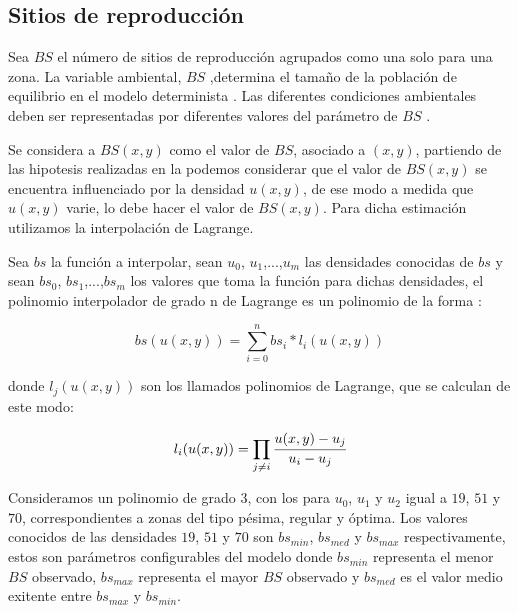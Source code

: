 \subsection{Sitios de reproducción}
\label{subsec:cap4-sitios de reproduccion}
Sea $BS$ el número de sitios de reproducción agrupados como una solo para una zona. La variable
ambiental, $BS$ ,determina el tamaño de la población de equilibrio en el modelo determinista
\cite{otero2006stochastic}. Las diferentes condiciones ambientales deben ser
representadas por diferentes valores del parámetro de $BS$ \cite{otero2006stochastic}.

Se considera a $BS(x,y)$ como el valor de $BS$, asociado a $(x,y)$, partiendo de las hipotesis
realizadas en la  podemos considerar que el valor de $BS(x,y)$ se
encuentra influenciado por la densidad $u(x,y)$, de ese modo a medida que $u(x,y)$ varie, lo debe
hacer el valor de $BS(x,y)$. Para dicha estimación utilizamos la interpolación de Lagrange.

Sea $bs$ la función a interpolar, sean $u_0$, $u_1$,...,$u_m$ las densidades conocidas de $bs$ y
sean $bs_0$, $bs_1$,...,$bs_m$ los valores que toma la función para dichas densidades, el polinomio interpolador de grado n de Lagrange es un polinomio de la forma :

\begin{equation}
\label{eq:sitios-reproduccion-x-y}
    bs(u(x,y)) = \sum_{i=0}^{n} bs_{i} * l_{i}(u(x,y))
\end{equation}

donde $l_j(u(x,y))$ son los llamados polinomios de Lagrange, que se calculan de este modo:

\begin{equation}
\label{eq:sitios-reproduccion-x-y}
    l_{i}(u(x,y)) = \prod_{j \neq i} \cfrac{u(x,y) - u_{j}}{u_{i} - u_{j}}
\end{equation}

Consideramos un polinomio de grado 3, con los para $u_0$, $u_1$ y $u_2$ igual a $19$, $51$ y $70$,
correspondientes a zonas del tipo pésima, regular y óptima. Los valores conocidos de las densidades
$19$, $51$ y $70$ son $bs_{min}$, $bs_{med}$ y $bs_{max}$ respectivamente, estos son parámetros
configurables del modelo donde $bs_{min}$ representa el menor $BS$ observado, $bs_{max}$
representa el mayor $BS$ observado y  $bs_{med}$ es el valor medio exitente entre $bs_{max}$ y
$bs_{min}$.
